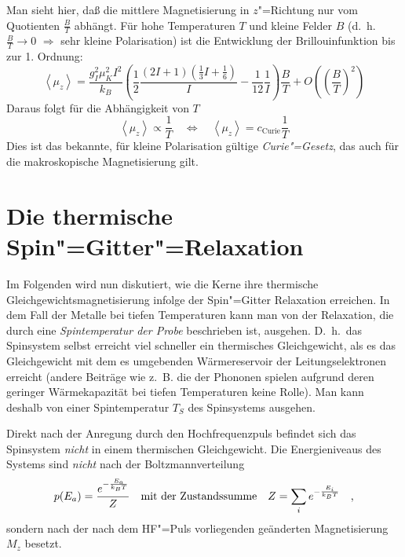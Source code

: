 Man sieht hier, daß die mittlere Magnetisierung in $z$"=Richtung nur vom Quotienten $\frac{B}{T}$
abhängt. Für hohe Temperaturen $T$ und kleine Felder $B$ (d.\ h.\ $\frac{B}{T}\rightarrow0$
$\Rightarrow$ sehr kleine Polarisation) ist die
Entwicklung der Brillouinfunktion bis zur 1. Ordnung:
	\begin{equation}
		\left<\mu_z\right>
			=\frac{g_I^2\mu_K^2I^2}{k_B} \left(\frac12\frac{(2I+1)\left(\frac13I+\frac16\right)}{I}-\frac1{12}\frac1{I}\right)\frac{B}{T}
			+ O\left(\left(\frac{B}{T}\right)^2\right)
	\end{equation}
Daraus folgt für die Abhängigkeit von $T$
	\begin{equation}
		\label{eqn:curie}
		\left<\mu_z\right> \propto \frac1{T}\quad\Leftrightarrow\quad\left<\mu_z\right>=c_\mathrm{Curie}\frac1{T}
	\end{equation}
Dies ist das bekannte, für kleine Polarisation gültige \emph{Curie"=Gesetz}, das auch für die
makroskopische Magnetisierung gilt.


\section{Die thermische Spin"=Gitter"=Relaxation}
\label{sec:sgrelax}


Im Folgenden wird nun diskutiert, wie die Kerne ihre thermische Gleichgewichtsmagnetisierung
infolge der Spin"=Gitter Relaxation erreichen. In dem Fall der Metalle bei tiefen Temperaturen kann
man von der Relaxation, die durch eine \emph{Spintemperatur der Probe} beschrieben ist, ausgehen.
D.\ h.\ das Spinsystem selbst erreicht viel schneller ein thermisches Gleichgewicht, als es das
Gleichgewicht mit dem es umgebenden Wärmereservoir der Leitungselektronen erreicht (andere
Beiträge wie z.\ B. die der Phononen spielen aufgrund deren geringer Wärmekapazität bei tiefen
Temperaturen keine Rolle). Man kann deshalb von einer Spintemperatur $T_S$ des Spinsystems
ausgehen.

Direkt nach der Anregung durch den Hochfrequenzpuls befindet sich das Spinsystem \emph{nicht} in einem
thermischen Gleichgewicht. Die Energieniveaus des Systems sind \emph{nicht} nach der Boltzmannverteilung
	\begin{equation}
		\label{eqn:boltzmann}
		p(E_a)=\frac{e^{-\frac{E_a}{k_BT}}}{Z}
			\quad\text{mit der Zustandssumme}\quad Z=\sum_ie^{-\frac{E_i}{k_BT}}\quad\text{,}
	\end{equation}
sondern nach der nach dem HF"=Puls vorliegenden geänderten Magnetisierung $M_z$ besetzt.

